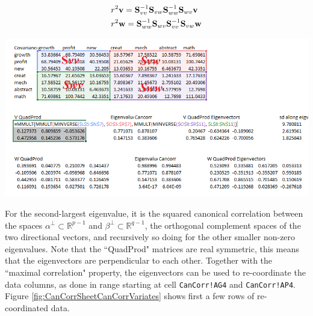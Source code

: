 \documentclass[article]{jss}
\begin{document}
        \[\begin{gathered}
        r^2\textbf{v}  = \textbf{S}_{vv}^{ - 1}{\textbf{S}_{vw}}\textbf{S}_{ww}^{ - 1}{\textbf{S}_{wv}}\textbf{v}  \hfill \\
        r^2\textbf{w} = \textbf{S}_{ww}^{ - 1}{\textbf{S}_{wv}}\textbf{S}_{vv}^{ - 1}{\textbf{S}_{vw}}\textbf{w}  \hfill \\ 
        \end{gathered} \]
        \begin{center}
          \vspace{-20pt}\includegraphics[width=\linewidth, keepaspectratio=true]{CanCorrSheetExplain_png}
        \end{center}
        For the second-largest eigenvalue, it is the squared canonical correlation between the spaces $\alpha^\bot\subset\mathbb{R}^{p-1}$ and $\beta^\bot\subset\mathbb{R}^{q-1}$, the orthogonal complement spaces of the two directional vectors, and recursively so doing for the other smaller non-zero eigenvalues. Note that the ``QuadProd" matrices are real symmetric, this means that the eigenvectors are perpendicular to each other. Together with the ``maximal correlation" property, the eigenvectors can be used to re-coordinate the data columns, as done in range starting at cell \texttt{CanCorr!AG4} and \texttt{CanCorr!AP4}. Figure \ref{fig:CanCorrSheetCanCorrVariates} shows first a few rows of re-coordinated data.
\end{document}
